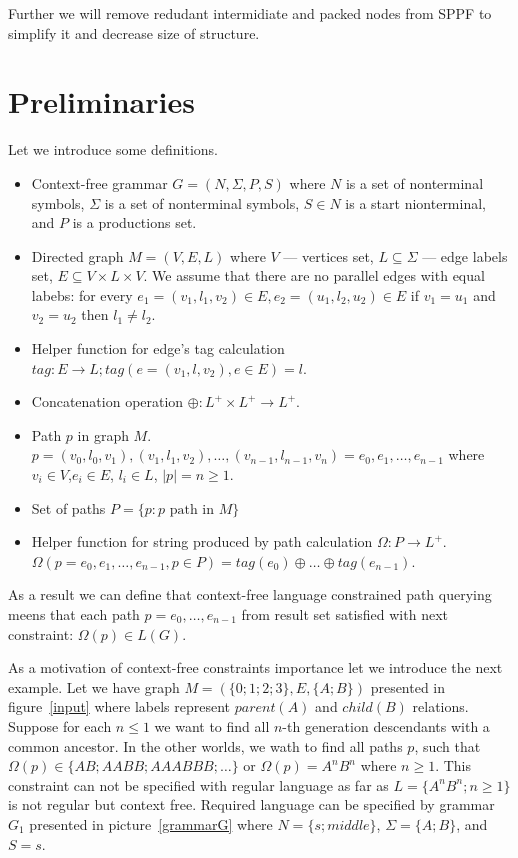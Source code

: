 \documentclass{sig-alternate} %
\begin{document}
Further we will remove redudant intermidiate and packed nodes from SPPF to simplify it and decrease size of structure.




\section{Preliminaries}

Let we introduce some definitions.
\begin{itemize}
  \item Context-free grammar $G=(N, \Sigma, P, S)$ where $N$ is a set of nonterminal symbols, $\Sigma$ is a set of nonterminal symbols, $S \in N$ is a start nionterminal, and $P$ is a productions set. 
  \item Directed graph $M = (V,E,L)$ where $V$ --- vertices set, $L \subseteq \Sigma$ --- edge labels set, $E\subseteq V\times L\times V$. 
  We assume that there are no parallel edges with equal labebs: for every $e_1=(v_1,l_1,v_2) \in E, e_2=(u_1,l_2,u_2) \in E$ if $v_1 = u_1$ and $v_2 = u_2$ then $l_1 \neq l_2$.
  \item Helper function for edge's tag calculation $tag: E \rightarrow L; tag(e = (v_1,l,v_2), e \in E) = l$.
  \item Concatenation operation $\oplus: L^+ \times L^+ \rightarrow L^+$.
  \item Path $p$ in graph $M$. \\ $p = (v_0,l_0,v_1),(v_1,l_1,v_2),\dots,(v_{n-1},l_{n-1},v_n) = e_0,e_1,\dots,e_{n-1}$ where $v_i \in V$,$e_i \in E$, $l_i \in L$, $|p| = n \geq 1$. 
  \item Set of paths $P = \{p: p \text{ path in } M\}$
  \item Helper function for string produced by path calculation $\Omega: P \rightarrow L^+$.\\ $\Omega(p = e_0,e_1,\dots,e_{n-1}, p \in P) = tag (e_0) \oplus \dots \oplus tag (e_{n-1})$.
\end{itemize}

As a result we can define that context-free language constrained path querying meens that each path $p = e_0,\dots,e_{n-1}$ from result set satisfied with next constraint: $\Omega(p) \in L(G)$. 

As a motivation of context-free constraints importance let we introduce the next example.
Let we have graph $M=(\{0;1;2;3\},E,\{A;B\})$ presented in figure~\ref{input} where labels represent $parent (A)$ and $child (B)$ relations. 
Suppose for each $n \leq 1$ we want to find all $n$-th generation descendants with a common ancestor.
In the other worlds, we wath to find all paths $p$, such that $\Omega(p) \in \{AB; AABB; AAABBB; \dots\}$ or $\Omega(p) = A^n B^n$ where $n \geq 1$.
This constraint can not be specified with regular language as far as $L=\{A^n B^n; n \geq 1\}$ is not regular but context free.
Required language can be specified by grammar $G_1$ presented in picture~\ref{grammarG} where $N = \{s; middle\}$, $\Sigma = \{A; B\}$, and $S = s$.
\end{document}

